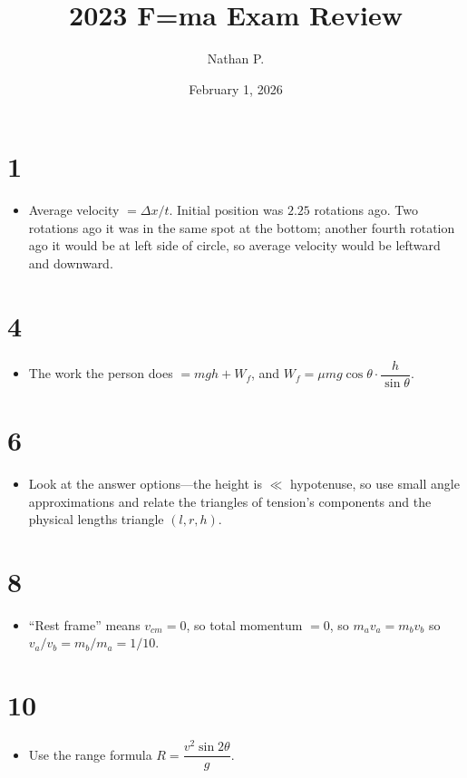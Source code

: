 \documentclass[11pt]{article}
\title{2023 F=ma Exam Review}
\author{Nathan P.}
\date{February 1, 2026}
\begin{document}
\maketitle

\section*{1}
\begin{itemize}[leftmargin=*, itemsep=0.25em]
\item Average velocity $=\Delta x/t$. Initial position was $2.25$ rotations ago. Two rotations ago it was in the same spot at the bottom; another fourth rotation ago it would be at left side of circle, so average velocity would be leftward and downward.
\end{itemize}

\section*{4}
\begin{itemize}[leftmargin=*, itemsep=0.25em]
\item The work the person does $=mgh+W_f$, and $W_f=\mu mg\cos\theta\cdot \dfrac{h}{\sin\theta}$.
\end{itemize}

\section*{6}
\begin{itemize}[leftmargin=*, itemsep=0.25em]
\item Look at the answer options---the height is $\ll$ hypotenuse, so use small angle approximations and relate the triangles of tension's components and the physical lengths triangle $(l,r,h)$.
\end{itemize}

\section*{8}
\begin{itemize}[leftmargin=*, itemsep=0.25em]
\item ``Rest frame'' means $v_{cm}=0$, so total momentum $=0$, so $m_a v_a=m_b v_b$ so $v_a/v_b=m_b/m_a=1/10$.
\end{itemize}

\section*{10}
\begin{itemize}[leftmargin=*, itemsep=0.25em]
\item Use the range formula $R=\dfrac{v^2\sin 2\theta}{g}$.
\end{itemize}
\end{document}
